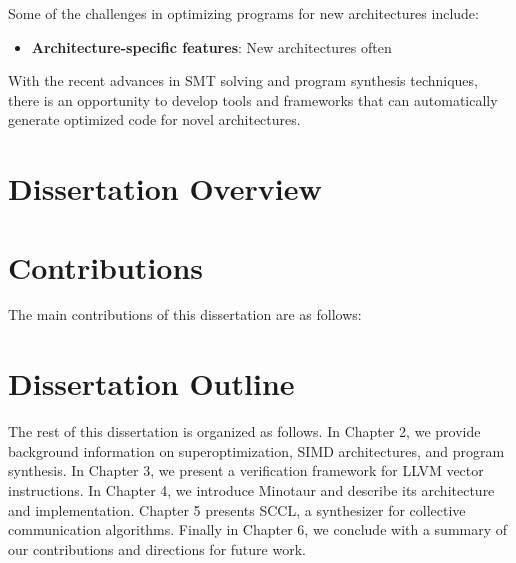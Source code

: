 Some of the challenges in optimizing programs for new architectures
include:

\begin{itemize}
\item \textbf{Architecture-specific features}: New architectures often
\end{itemize}


With the recent advances in SMT solving and program synthesis
techniques, there is an opportunity to develop tools and frameworks
that can automatically generate optimized code for novel
architectures.


\section{Dissertation Overview}



\section{Contributions}

The main contributions of this dissertation are as follows:

\section{Dissertation Outline}

The rest of this dissertation is organized as follows. In Chapter 2, we
provide background information on superoptimization, SIMD architectures,
and program synthesis. In Chapter 3, we present a verification framework
for LLVM vector instructions. In Chapter 4, we introduce Minotaur and
describe its architecture and implementation. Chapter 5 presents SCCL,
a synthesizer for collective communication algorithms. Finally in Chapter
6, we conclude with a summary of our contributions and directions for
future work.





